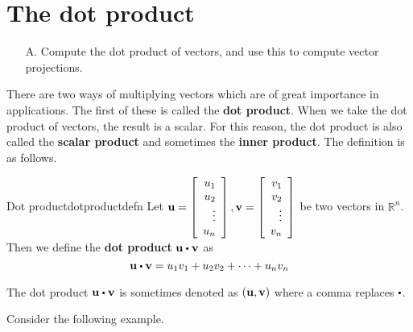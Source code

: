 \section{The dot product}

\begin{outcome}

\begin{enumerate}
\item[A.] Compute the dot product of vectors, and use this to compute vector projections.
\end{enumerate}
\end{outcome}

There are two ways of multiplying vectors which are of great importance in
applications. The first of these is called the \textbf{dot product}. When we take the dot product of vectors, the 
result is a scalar. For this reason, the dot product is also
called the \textbf{scalar product }and sometimes the \textbf{inner product}. The definition is as follows.

\begin{definition}{Dot product}{dotproductdefn}
Let ${\bf u}=\left[ 
\begin{array}{r}
u_1 \\
u_2 \\
\vdots \\
u_n 
\end{array}
\right] ,{\bf v}= \left[ 
\begin{array}{r}
v_1 \\
v_2 \\
\vdots \\
v_n 
\end{array}
\right]$ be two vectors in $\mathbb{R}^{n}$. Then we
define the \textbf{dot product}  $\vect{u}\dotprod \vect{v}$ as
\begin{equation*}
\vect{u}\dotprod \vect{v} = u_1v_1+u_2v_2+\cdots+u_nv_n
\end{equation*}
\end{definition}

The dot product $\vect{u}\dotprod \vect{v}$ is sometimes denoted as $({\bf u},{\bf v})$ where a comma replaces $\dotprod $.

Consider the following example.

